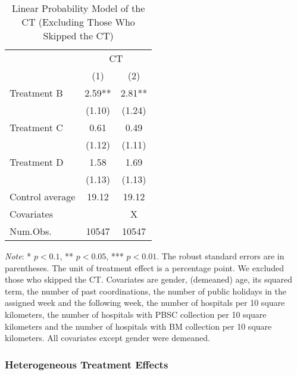 \documentclass[12pt, a4paper]{article}
\begin{document}
\begin{table}[H]

\caption{\label{tab:lm-test-noskip}Linear Probability Model of the CT (Excluding Those Who Skipped the CT)}
\centering
\fontsize{8}{10}\selectfont
\begin{threeparttable}
\begin{tabular}[t]{>{\raggedright\arraybackslash}p{20em}cc}
\toprule
\multicolumn{1}{c}{ } & \multicolumn{2}{c}{CT} \\
\cmidrule(l{3pt}r{3pt}){2-3}
  & (1) & (2)\\
\midrule
Treatment B & \num{2.59}** & \num{2.81}**\\
 & (\num{1.10}) & (\num{1.24})\\
Treatment C & \num{0.61} & \num{0.49}\\
 & (\num{1.12}) & (\num{1.11})\\
Treatment D & \num{1.58} & \num{1.69}\\
 & (\num{1.13}) & (\num{1.13})\\
\midrule
Control average & 19.12 & 19.12\\
Covariates &  & X\\
Num.Obs. & \num{10547} & \num{10547}\\
\bottomrule
\end{tabular}
\begin{tablenotes}
\item \emph{Note}: * $p < 0.1$, ** $p < 0.05$, *** $p < 0.01$. The robust standard errors are in parentheses. The unit of treatment effect is a percentage point. We excluded those who skipped the CT. Covariates are gender, (demeaned) age, its squared term, the number of past coordinations, the number of public holidays in the assigned week and the following week, the number of hospitals per 10 square kilometers, the number of hospitals with PBSC collection per 10 square kilometers and the number of hospitals with BM collection per 10 square kilometers. All covariates except gender were demeaned.
\end{tablenotes}
\end{threeparttable}
\end{table}

\hypertarget{heterogeneous-treatment-effects}{%
\subsubsection{Heterogeneous Treatment Effects}\label{heterogeneous-treatment-effects}}
\end{document}
